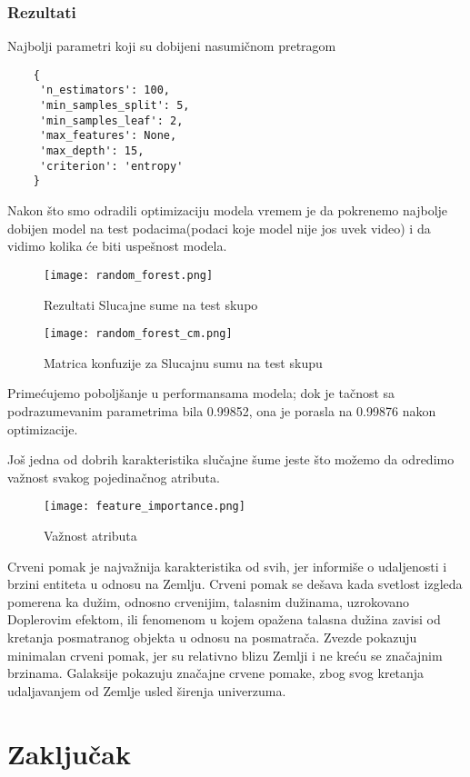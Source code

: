 \documentclass[a4paper,12pt]{article}
\begin{document}
\subsubsection{Rezultati}
Najbolji parametri koji su dobijeni nasumičnom pretragom
\begin{verbatim}
    {
     'n_estimators': 100,
     'min_samples_split': 5,
     'min_samples_leaf': 2,
     'max_features': None,
     'max_depth': 15,
     'criterion': 'entropy'
    }
\end{verbatim}

Nakon što smo odradili optimizaciju modela vremem je da pokrenemo najbolje dobijen model na test podacima(podaci koje model nije jos uvek video) i da vidimo kolika će biti uspešnost modela.

\begin{figure}
    \centering
    \texttt{[image: random\_forest.png]}
    \caption{Rezultati Slucajne sume na test skupo}
    \label{fig:random_forest}
\end{figure}

\clearpage
\begin{figure}
    \centering
    \texttt{[image: random\_forest\_cm.png]}
    \caption{Matrica konfuzije za Slucajnu sumu na test skupu}
    \label{fig:random_forest_cm}
\end{figure}

Primećujemo poboljšanje u performansama modela; dok je tačnost sa podrazumevanim parametrima bila 0.99852, ona je porasla na 0.99876 nakon optimizacije.



Još jedna od dobrih karakteristika slučajne šume jeste što možemo da odredimo važnost svakog pojedinačnog atributa.
\begin{figure}
    \centering
    \texttt{[image: feature\_importance.png]}
    \caption{Važnost atributa}
    \label{fig:feature_importance}
\end{figure}
Crveni pomak je najvažnija karakteristika od svih, jer informiše o udaljenosti i brzini entiteta u odnosu na Zemlju. Crveni pomak se dešava kada svetlost izgleda pomerena ka dužim, odnosno crvenijim, talasnim dužinama, uzrokovano Doplerovim efektom, ili fenomenom u kojem opažena talasna dužina zavisi od kretanja posmatranog objekta u odnosu na posmatrača.
Zvezde pokazuju minimalan crveni pomak, jer su relativno blizu Zemlji i ne kreću se značajnim brzinama. Galaksije pokazuju značajne crvene pomake, zbog svog kretanja udaljavanjem od Zemlje usled širenja univerzuma.

\section{Zaključak}


\begin{thebibliography}{9}
\end{thebibliography}
\end{document}
